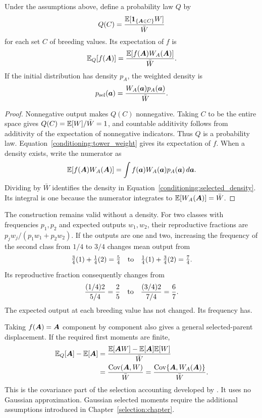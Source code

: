 \begin{proposition}
\label{conditioning:selection_weight}
Under the assumptions above, define a probability law \(Q\) by
\[
 Q(C)=\frac{\mathbb E[{\boldsymbol 1}_{\{\boldsymbol{A}\in C\}}W]}{\bar W}
\]
for each set \(C\) of breeding values. Its expectation of \(f\) is
\begin{equation}
 \mathbb E_Q[f(\boldsymbol{A})]
 =\frac{\mathbb E[f(\boldsymbol{A})W_A(\boldsymbol{A})]}{\bar W}.
 \label{conditioning:weighted_expectation}
\end{equation}
If the initial distribution has density \(p_A\), the weighted density is
\begin{equation}
 p_{\rm sel}(\boldsymbol{a})
 =\frac{W_A(\boldsymbol{a})p_A(\boldsymbol{a})}{\bar W}.
 \label{conditioning:selected_density}
\end{equation}
\end{proposition}

\begin{proof}
Nonnegative output makes \(Q(C)\) nonnegative. Taking \(C\) to be the entire
space gives \(Q(C)=\mathbb E[W]/\bar W=1\), and countable additivity follows from
additivity of the expectation of nonnegative indicators. Thus \(Q\) is a
probability law. Equation~\eqref{conditioning:tower_weight} gives its
expectation of \(f\). When a density exists, write the numerator as
\[
 \mathbb E[f(\boldsymbol{A})W_A(\boldsymbol{A})]
 =\int f(\boldsymbol{a})W_A(\boldsymbol{a})p_A(\boldsymbol{a})\,d\boldsymbol{a}.
\]
Dividing by \(\bar W\) identifies the density in
Equation~\eqref{conditioning:selected_density}. Its integral is one because
the numerator integrates to \(\mathbb E[W_A(\boldsymbol{A})]=\bar W\).
\end{proof}

The construction remains valid without a density. For two classes with
frequencies \(p_1,p_2\) and expected outputs \(w_1,w_2\), their reproductive
fractions are \(p_jw_j/(p_1w_1+p_2w_2)\). If the outputs are one and two,
increasing the frequency of the second class from \(1/4\) to \(3/4\) changes
mean output from
\[
 \tfrac34(1)+\tfrac14(2)=\tfrac54
 \quad\hbox{to}\quad
 \tfrac14(1)+\tfrac34(2)=\tfrac74.
\]
Its reproductive fraction consequently changes from
\[
 \frac{(1/4)2}{5/4}=\frac25
 \quad\hbox{to}\quad
 \frac{(3/4)2}{7/4}=\frac67.
\]
The expected output at each breeding value has not changed. Its frequency has.

Taking \(f(\boldsymbol{A})=\boldsymbol{A}\) component by component also gives a general
selected-parent displacement. If the required first moments are finite,
\begin{align}
 \mathbb E_Q[\boldsymbol{A}]-\mathbb E[\boldsymbol{A}]
 &=\frac{\mathbb E[\boldsymbol{A} W]-\mathbb E[\boldsymbol{A}]\mathbb E[W]}{\bar W}\nonumber\\
 &=\frac{\operatorname{Cov}(\boldsymbol{A},W)}{\bar W}
 =\frac{\operatorname{Cov}\{\boldsymbol{A},W_A(\boldsymbol{A})\}}{\bar W}.
 \label{conditioning:covariance_displacement}
\end{align}
This is the covariance part of the selection accounting developed by
\citet{Price1970}. It uses no Gaussian approximation. Gaussian selected
moments require the additional assumptions introduced in
Chapter~\ref{selection:chapter}.


